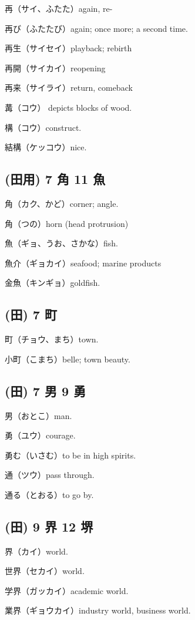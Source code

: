 再（サイ、ふたた）again, re-

再び（ふたたび）again; once more; a second time.

再生（サイセイ）playback; rebirth

再開（サイカイ）reopening

再来（サイライ）return, comeback

冓（コウ） depicts blocks of wood.

構（コウ）construct.

結構（ケッコウ）nice.

\subsection{(田用) 7 角 11 魚}

角（カク、かど）corner; angle.

角（つの）horn (head protrusion)

魚（ギョ、うお、さかな）fish.

魚介（ギョカイ）seafood; marine products

金魚（キンギョ）goldfish.

\subsection{(田) 7 町}

町（チョウ、まち）town.

小町（こまち）belle; town beauty.

\subsection{(田) 7 男 9 勇}

男（おとこ）man.

勇（ユウ）courage.

勇む（いさむ）to be in high spirits.

通（ツウ）pass through.

通る（とおる）to go by.

\subsection{(田) 9 界 12 堺}

界（カイ）world.

世界（セカイ）world.

学界（ガッカイ）academic world.

業界（ギョウカイ）industry world, business world.

